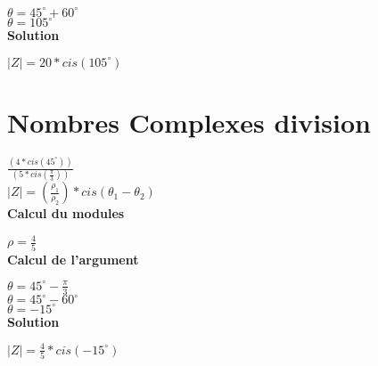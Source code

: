 $\theta = 45^{\circ} + 60^{\circ}$ \\

$\theta = 105^{\circ}$ \\

\vspace{6mm}
\textbf{Solution}
\vspace{5mm}

$|Z| = 20 * cis(105^{\circ})$

\newpage
\section{Nombres Complexes division}
\vspace{3mm} %

$\frac{(4 * cis(45^{\circ} ))} {(5 * cis(\frac{\pi}{3}))} $ \\

$|Z| = (\frac{\rho_{1}}{\rho_{2}})* cis(\theta_{1} - \theta_{2})$ \\

\vspace{6mm}
\textbf{Calcul du modules}
\vspace{5mm}

$\rho = \frac{4}{5}$ \\

\vspace{6mm}
\textbf{Calcul de l'argument}
\vspace{5mm}

$\theta = 45^{\circ} - \frac{\pi}{3} $ \\

$\theta = 45^{\circ} - 60^{\circ} $ \\

$\theta = - 15^{\circ} $ \\

\vspace{6mm}
\textbf{Solution}
\vspace{5mm}

$ |Z| = \frac{4}{5} * cis(- 15^{\circ})$ \\
